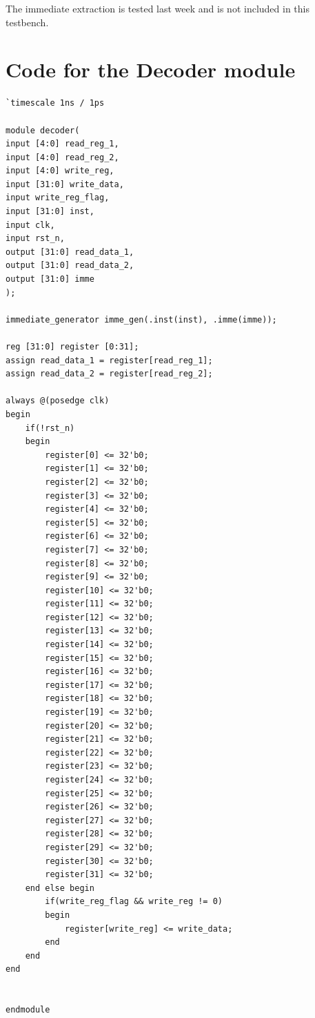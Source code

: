 \documentclass[a4paper,12pt]{article}
\begin{document}
The immediate extraction is tested last week and is not included in this testbench.

\section{Code for the Decoder module}

\begin{center}
	\begin{verbatim}
`timescale 1ns / 1ps

module decoder(
input [4:0] read_reg_1,
input [4:0] read_reg_2,
input [4:0] write_reg,
input [31:0] write_data,
input write_reg_flag,
input [31:0] inst,
input clk,
input rst_n,
output [31:0] read_data_1,
output [31:0] read_data_2,
output [31:0] imme
);

immediate_generator imme_gen(.inst(inst), .imme(imme));

reg [31:0] register [0:31];
assign read_data_1 = register[read_reg_1];
assign read_data_2 = register[read_reg_2];
    
always @(posedge clk)
begin
    if(!rst_n)
    begin
        register[0] <= 32'b0;
        register[1] <= 32'b0;
        register[2] <= 32'b0;
        register[3] <= 32'b0;
        register[4] <= 32'b0;
        register[5] <= 32'b0;
        register[6] <= 32'b0;
        register[7] <= 32'b0;
        register[8] <= 32'b0;
        register[9] <= 32'b0;
        register[10] <= 32'b0;
        register[11] <= 32'b0;
        register[12] <= 32'b0;
        register[13] <= 32'b0;
        register[14] <= 32'b0;
        register[15] <= 32'b0;
        register[16] <= 32'b0;
        register[17] <= 32'b0;
        register[18] <= 32'b0;
        register[19] <= 32'b0;
        register[20] <= 32'b0;
        register[21] <= 32'b0;
        register[22] <= 32'b0;
        register[23] <= 32'b0;
        register[24] <= 32'b0;
        register[25] <= 32'b0;
        register[26] <= 32'b0;
        register[27] <= 32'b0;
        register[28] <= 32'b0;
        register[29] <= 32'b0;
        register[30] <= 32'b0;
        register[31] <= 32'b0;
    end else begin
        if(write_reg_flag && write_reg != 0)
        begin
            register[write_reg] <= write_data;
        end
    end
end


endmodule
	\end{verbatim}
\end{center}
\end{document}

